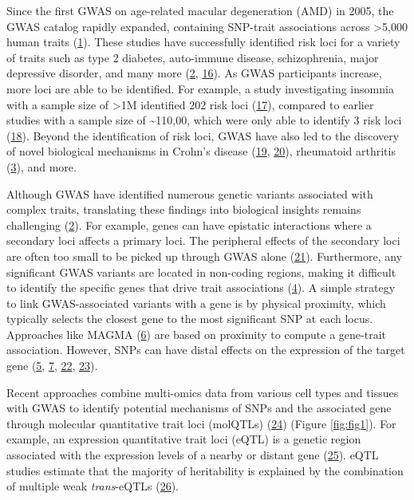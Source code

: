 Since the first GWAS on age-related macular degeneration (AMD) in 2005, the GWAS catalog rapidly expanded, containing SNP-trait associations across \textgreater5,000 human traits (\protect\hyperlink{ref-VRCjjZ9L}{1}).
These studies have successfully identified risk loci for a variety of traits such as type 2 diabetes, auto-immune disease, schizophrenia, major depressive disorder, and many more (\protect\hyperlink{ref-17B4AigZT}{2}, \protect\hyperlink{ref-yqBcaXHD}{16}).
As GWAS participants increase, more loci are able to be identified.
For example, a study investigating insomnia with a sample size of \textgreater1M identified 202 risk loci (\protect\hyperlink{ref-sBTrhvlJ}{17}), compared to earlier studies with a sample size of \textasciitilde110,00, which were only able to identify 3 risk loci (\protect\hyperlink{ref-crCAymA1}{18}).
Beyond the identification of risk loci, GWAS have also led to the discovery of novel biological mechanisms in Crohn's disease (\protect\hyperlink{ref-s6z5ZuY3}{19}, \protect\hyperlink{ref-gxwza7fO}{20}), rheumatoid arthritis (\protect\hyperlink{ref-HicyXvA4}{3}), and more.

Although GWAS have identified numerous genetic variants associated with complex traits, translating these findings into biological insights remains challenging (\protect\hyperlink{ref-17B4AigZT}{2}).
For example, genes can have epistatic interactions where a secondary loci affects a primary loci.
The peripheral effects of the secondary loci are often too small to be picked up through GWAS alone (\protect\hyperlink{ref-IrGVpNji}{21}).
Furthermore, any significant GWAS variants are located in non-coding regions, making it difficult to identify the specific genes that drive trait associations (\protect\hyperlink{ref-BqjxxhyF}{4}).
A simple strategy to link GWAS-associated variants with a gene is by physical proximity, which typically selects the closest gene to the most significant SNP at each locus.
Approaches like MAGMA (\protect\hyperlink{ref-19XiXgYmd}{6}) are based on proximity to compute a gene-trait association.
However, SNPs can have distal effects on the expression of the target gene (\protect\hyperlink{ref-9Pr9idng}{5}, \protect\hyperlink{ref-167QL5tMV}{7}, \protect\hyperlink{ref-OBxYzUMh}{22}, \protect\hyperlink{ref-WfdUHVDA}{23}).

Recent approaches combine multi-omics data from various cell types and tissues with GWAS to identify potential mechanisms of SNPs and the associated gene through molecular quantitative trait loci (molQTLs) (\protect\hyperlink{ref-QIEm5ZWK}{24}) (Figure \ref{fig:fig1}).
For example, an expression quantitative trait loci (eQTL) is a genetic region associated with the expression levels of a nearby or distant gene (\protect\hyperlink{ref-1FHKg3JK5}{25}).
eQTL studies estimate that the majority of heritability is explained by the combination of multiple weak \emph{trans}-eQTLs (\protect\hyperlink{ref-sGgkLsyy}{26}).

